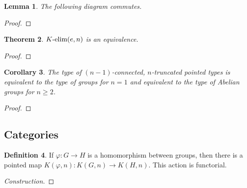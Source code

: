 \documentclass{article}
\newcommand{\Kelim}{K\textnormal{-elim}}
\newtheorem{theorem}{Theorem}[section]
\newtheorem{lemma}[theorem]{Lemma}
\newtheorem{corollary}[theorem]{Corollary}
\theoremstyle{definition}
\newtheorem{definition}[theorem]{Definition}
\theoremstyle{remark}
\renewcommand{\phi}{\varphi}
\begin{document}
\begin{lemma}
The following diagram commutes.%
\begin{center}
\end{center}

\end{lemma}
\begin{proof}
\end{proof}

\begin{theorem}
$\Kelim(e,n)$ is an equivalence.
\end{theorem}
\begin{proof}
\end{proof}

\begin{corollary}
The type of $(n-1)$-connected, $n$-truncated pointed types is equivalent to the type of groups for
$n=1$ and equivalent to the type of Abelian groups for $n \geq 2$.
\end{corollary}
\begin{proof}
\end{proof}

\subsection{Categories}
\begin{definition}
  If $\phi : G \to H$ is a homomorphism between groups, then there is a pointed map $K(\phi, n) :
  K(G, n) \to K(H, n)$. This action is functorial.
\end{definition}
\begin{proof}[Construction]
\end{proof}
\end{document}
